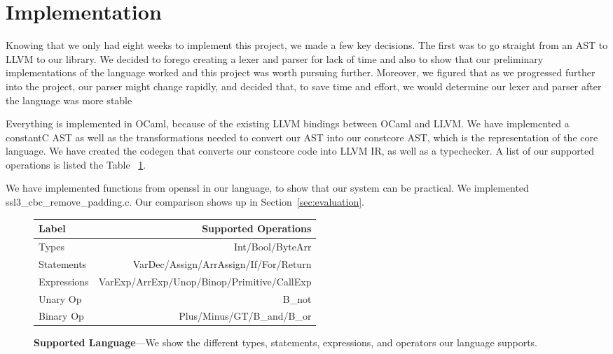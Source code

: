 \section{Implementation}
\label{sec:implementation}

Knowing that we only had eight weeks to implement this project, we made a few
key decisions. The first was to go straight from an AST to LLVM to our library.
We decided to forego creating a lexer and parser for lack of time and also to
show that our preliminary implementations of the language worked and this
project was worth pursuing further. Moreover, we figured that as we progressed
further into the project, our parser might change rapidly, and decided that, to
save time and effort, we would determine our lexer and parser after the language
was more stable

Everything is implemented in OCaml\cite{ocaml}, because of the existing LLVM
bindings between OCaml and LLVM.  We have implemented a constantC AST as well as
the transformations needed to convert our AST into our constcore AST, which is
the representation of the core language.  We have created the codegen that
converts our constcore code into LLVM IR, as well as a typechecker. A list of
our supported operations is listed the Table ~\ref{table:functions}.

We have implemented functions from openssl in our language, to show that our
system can be practical. We implemented ssl3\_cbc\_remove\_padding.c. Our
comparison shows up in Section~\ref{sec:evaluation}.
\begin{figure}
        \centering
        \small
        \begin{tabularx}{\columnwidth}{lr}
        \toprule
        Label & Supported Operations\\
        \midrule
        Types &  Int/Bool/ByteArr \\
        Statements & VarDec/Assign/ArrAssign/If/For/Return \\
        Expressions & VarExp/ArrExp/Unop/Binop/Primitive/CallExp \\
        Unary Op &  B\_not \\
        Binary Op & Plus/Minus/GT/B\_and/B\_or \\
        \bottomrule
        \end{tabularx}
        \caption{\textbf{Supported Language}---We show the different types,
        statements, expressions, and operators our language supports.}
    \label{table:functions}
\end{figure}

